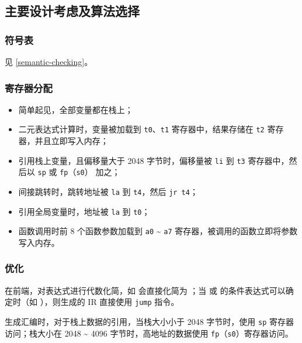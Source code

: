 \subsection{主要设计考虑及算法选择}
\subsubsection{符号表}
见 \ref{semantic-checking}。
\subsubsection{寄存器分配}\label{reg-alloc}
\begin{itemize}
    \item 简单起见，全部变量都在栈上；
    \item 二元表达式计算时，变量被加载到 \texttt{t0}、\texttt{t1} 寄存器中，结果存储在 \texttt{t2} 寄存器，并且立即写入内存；
    \item 引用栈上变量，且偏移量大于 2048 字节时，偏移量被 \texttt{li} 到 \texttt{t3} 寄存器中，然后以 \texttt{sp} 或 \texttt{fp}（\texttt{s0}） 加之；
    \item 间接跳转时，跳转地址被 \texttt{la} 到 \texttt{t4}，然后 \texttt{jr t4}；
    \item 引用全局变量时，地址被 \texttt{la} 到 \texttt{t0}；
    \item 函数调用时前 8 个函数参数加载到 \texttt{a0} \~{} \texttt{a7} 寄存器，被调用的函数立即将参数写入内存。
\end{itemize}
\subsubsection{优化}
在前端，对表达式进行代数化简，如  会直接化简为 ；当  或  的条件表达式可以确定时（如 ），则生成的 IR 直接使用 \texttt{jump} 指令。

生成汇编时，对于栈上数据的引用，当栈大小小于 2048 字节时，使用 \texttt{sp} 寄存器访问；栈大小在 2048 \~{} 4096 字节时，高地址的数据使用 \texttt{fp}（\texttt{s0}）寄存器访问。

